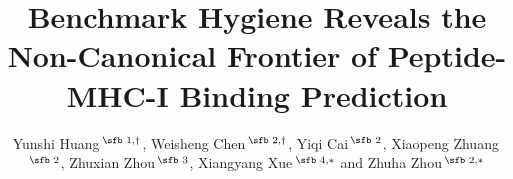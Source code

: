 \documentclass[nocrop]{bioinfo}
\begin{document}

\subtitle{}

\title[Benchmark Hygiene and the Non-Canonical Frontier]{Benchmark Hygiene Reveals the Non-Canonical Frontier of Peptide-MHC-I Binding Prediction}
\author[Huang \textit{et~al}.]{Yunshi Huang\,$^{\text{\sfb 1,$\dagger$}}$, Weisheng Chen\,$^{\text{\sfb 2,$\dagger$}}$, Yiqi Cai\,$^{\text{\sfb 2}}$, Xiaopeng Zhuang\,$^{\text{\sfb 2}}$, Zhuxian Zhou\,$^{\text{\sfb 3}}$, Xiangyang Xue\,$^{\text{\sfb 4,$*$}}$ and Zhuha Zhou\,$^{\text{\sfb 2,$*$}}$}
\address{$^{\text{\sf 1}}$Department of General Surgery, The First Affiliated Hospital of Wenzhou Medical University, Wenzhou, China and \\
$^{\text{\sf 2}}$Department of Gastroenterology Surgery, The First Affiliated Hospital of Wenzhou Medical University, Nanbaixiang Street, Ouhai District, 325000 Wenzhou, Zhejiang, China and \\
$^{\text{\sf 3}}$Center for Bionanoengineering, College of Chemical and Biological Engineering, Zhejiang University, Hangzhou 310027, China and \\
$^{\text{\sf 4}}$Zhejiang Key Laboratory of Intelligent Cancer Biomarker Discovery and Translation, The First Affiliated Hospital of Wenzhou Medical University, Wenzhou, China.}


\history{}

\editor{}



\maketitle







\vspace*{-10pt}


\vspace*{-12pt}


\vspace*{-12pt}


\end{document}

